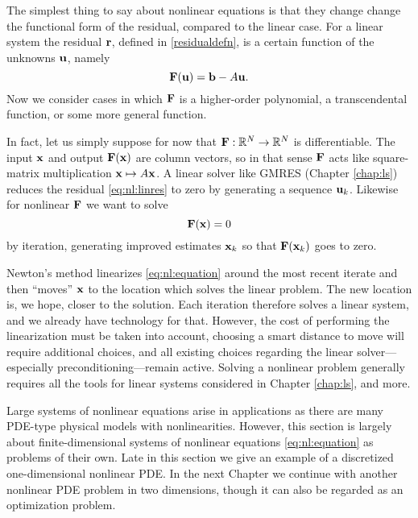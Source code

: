 
The simplest thing to say about nonlinear equations is that they change change the functional form of the residual, compared to the linear case.  For a linear system the residual $\mathbf{r}$, defined in \eqref{residualdefn}, is a certain function of the unknowns $\mathbf{u}$, namely
\begin{equation}
\mathbf{F}(\mathbf{u}) = \mathbf{b} - A \mathbf{u}. \label{eq:nl:linres}
\end{equation}
Now we consider cases in which $\mathbf{F}$ is a higher-order polynomial, a transcendental function, or some more general function.

In fact, let us simply suppose for now that $\mathbf{F} : \mathbb{R}^N \to \mathbb{R}^N$ is differentiable.  The input $\mathbf{x}$ and output $\mathbf{F}(\mathbf{x})$ are column vectors, so in that sense $\mathbf{F}$ acts like square-matrix multiplication $\mathbf{x}\mapsto A\mathbf{x}$.  A linear solver like GMRES (Chapter \ref{chap:ls}) reduces the residual \eqref{eq:nl:linres} to zero by generating a sequence $\mathbf{u}_k$.  Likewise for nonlinear $\mathbf{F}$ we want to solve
\begin{equation}
   \mathbf{F}(\mathbf{x}) = 0   \label{eq:nl:equation}
\end{equation}
by iteration, generating improved estimates $\mathbf{x}_k$ so that $\mathbf{F}(\mathbf{x}_k)$ goes to zero.

Newton's method linearizes \eqref{eq:nl:equation} around the most recent iterate and then ``moves'' $\mathbf{x}$ to the location which solves the linear problem.  The new location is, we hope, closer to the solution.  Each iteration therefore solves a linear system, and we already have \PETSc technology for that.  However, the cost of performing the linearization must be taken into account, choosing a smart distance to move will require additional choices, and all existing choices regarding the linear solver---especially preconditioning---remain active.  Solving a nonlinear problem generally requires all the tools for linear systems considered in Chapter \ref{chap:ls}, and more.

Large systems of nonlinear equations arise in applications as there are many PDE-type physical models with nonlinearities.  However, this section is largely about finite-dimensional systems of nonlinear equations \eqref{eq:nl:equation} as problems of their own.  Late in this section we give an example of a discretized one-dimensional nonlinear PDE.  In the next Chapter we continue with another nonlinear PDE problem in two dimensions, though it can also be regarded as an optimization problem.


